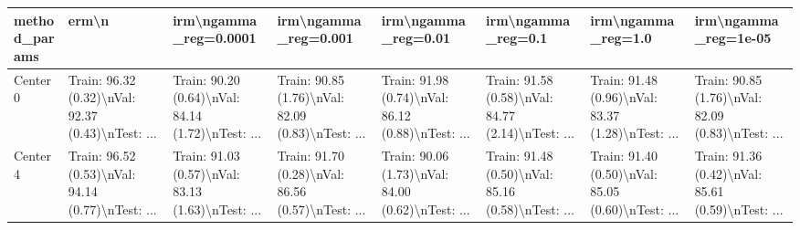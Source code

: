 \begin{tabular}{llllllll}
\toprule
method\_params &                                              erm\textbackslash n &                              irm\textbackslash ngamma\_reg=0.0001 &                               irm\textbackslash ngamma\_reg=0.001 &                                irm\textbackslash ngamma\_reg=0.01 &                                 irm\textbackslash ngamma\_reg=0.1 &                                 irm\textbackslash ngamma\_reg=1.0 &                               irm\textbackslash ngamma\_reg=1e-05 \\
\midrule
Center 0 &  Train: 96.32 (0.32)\textbackslash nVal: 92.37 (0.43)\textbackslash nTest: ... &  Train: 90.20 (0.64)\textbackslash nVal: 84.14 (1.72)\textbackslash nTest: ... &  Train: 90.85 (1.76)\textbackslash nVal: 82.09 (0.83)\textbackslash nTest: ... &  Train: 91.98 (0.74)\textbackslash nVal: 86.12 (0.88)\textbackslash nTest: ... &  Train: 91.58 (0.58)\textbackslash nVal: 84.77 (2.14)\textbackslash nTest: ... &  Train: 91.48 (0.96)\textbackslash nVal: 83.37 (1.28)\textbackslash nTest: ... &  Train: 90.85 (1.76)\textbackslash nVal: 82.09 (0.83)\textbackslash nTest: ... \\
Center 4 &  Train: 96.52 (0.53)\textbackslash nVal: 94.14 (0.77)\textbackslash nTest: ... &  Train: 91.03 (0.57)\textbackslash nVal: 83.13 (1.63)\textbackslash nTest: ... &  Train: 91.70 (0.28)\textbackslash nVal: 86.56 (0.57)\textbackslash nTest: ... &  Train: 90.06 (1.73)\textbackslash nVal: 84.00 (0.62)\textbackslash nTest: ... &  Train: 91.48 (0.50)\textbackslash nVal: 85.16 (0.58)\textbackslash nTest: ... &  Train: 91.40 (0.50)\textbackslash nVal: 85.05 (0.60)\textbackslash nTest: ... &  Train: 91.36 (0.42)\textbackslash nVal: 85.61 (0.59)\textbackslash nTest: ... \\
\bottomrule
\end{tabular}
